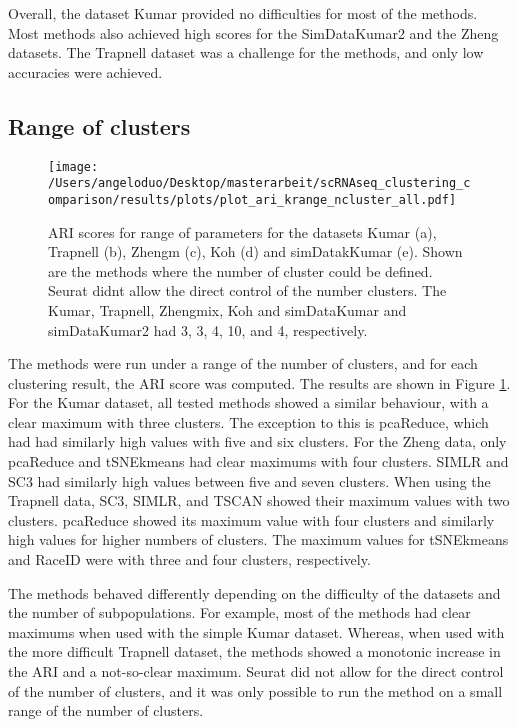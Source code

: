 \documentclass[11pt, a4paper]{article}\usepackage[]{graphicx}\usepackage[]{color}
\begin{document}
Overall, the dataset Kumar provided no difficulties for most of the methods. Most methods also achieved high scores for the SimDataKumar2 and the Zheng datasets. The Trapnell dataset was a challenge for the methods, and only low accuracies were achieved.


\subsection{Range of clusters}
\begin{figure}[!h]
\texttt{[image: /Users/angeloduo/Desktop/masterarbeit/scRNAseq\_clustering\_comparison/results/plots/plot\_ari\_krange\_ncluster\_all.pdf]}
\caption{ARI scores for range of parameters for the datasets Kumar (a), Trapnell (b), Zhengm (c), Koh (d) and simDatakKumar (e). Shown are the methods where the number of cluster could be defined. Seurat didnt allow the direct control of the number clusters. The Kumar, Trapnell, Zhengmix, Koh and simDataKumar and simDataKumar2 had 3, 3, 4, 10, and 4, respectively.}
\label{fig:arirangeall}
\end{figure}

The methods were run under a range of the number of clusters, and for each clustering result, the ARI score was computed. The results are shown in Figure \ref{fig:arirangeall}. For the Kumar dataset, all tested methods showed a similar behaviour, with a clear maximum with three clusters. The exception to this is pcaReduce, which had had similarly high values with five and six clusters. For the Zheng data, only pcaReduce and tSNEkmeans had clear maximums with four clusters. SIMLR and SC3 had similarly high values between five and seven clusters. When using the Trapnell data, SC3, SIMLR, and TSCAN showed their maximum values with two clusters. pcaReduce showed its maximum value with four clusters and similarly high values for higher numbers of clusters. The maximum values for tSNEkmeans and RaceID were with three and four clusters, respectively.

The methods behaved differently depending on the difficulty of the datasets and the number of subpopulations. For example, most of the methods had clear maximums when used with the simple Kumar dataset. Whereas, when used with the more difficult Trapnell dataset, the methods showed a monotonic increase in the ARI and a not-so-clear maximum. Seurat did not allow for the direct control of the number of clusters, and it was only possible to run the method on a small range of the number of clusters.
\end{document}

